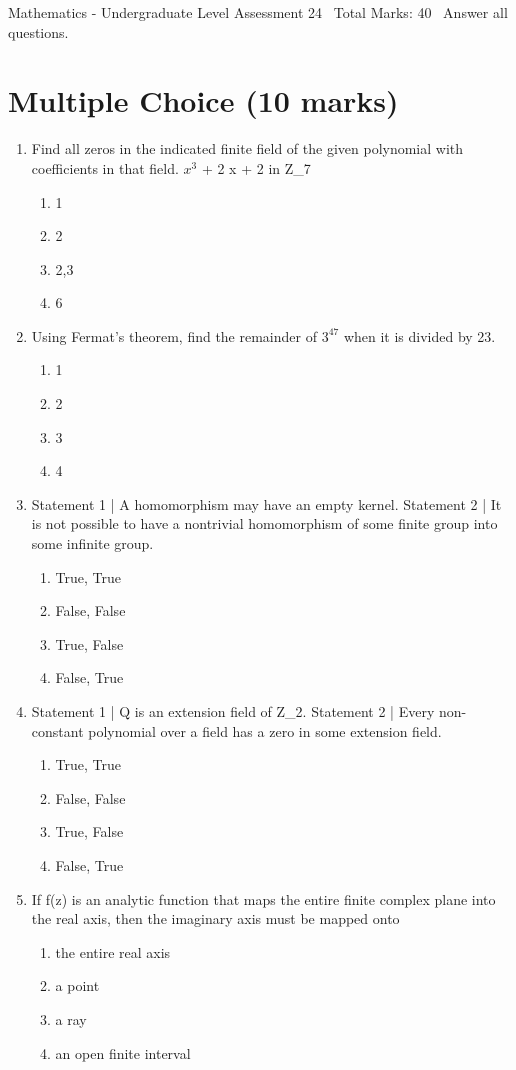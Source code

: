 \documentclass[12pt]{article}
\begin{document}
\begin{center}
Mathematics - Undergraduate Level Assessment 24 \
Total Marks: 40 \
Answer all questions.
\end{center}

\section*{Multiple Choice (10 marks)}
\begin{enumerate}[label=\arabic*.]
\item Find all zeros in the indicated finite field of the given polynomial with coefficients in that field. $x^3$ + 2 x + 2 in Z\_7
\begin{enumerate}[label=(\alph*)]
    \item 1
    \item 2
    \item 2,3
    \item 6
\end{enumerate}
\item Using Fermat's theorem, find the remainder of $3^47$ when it is divided by 23.
\begin{enumerate}[label=(\alph*)]
    \item 1
    \item 2
    \item 3
    \item 4
\end{enumerate}
\item Statement 1 | A homomorphism may have an empty kernel. Statement 2 | It is not possible to have a nontrivial homomorphism of some finite group into some infinite group.
\begin{enumerate}[label=(\alph*)]
    \item True, True
    \item False, False
    \item True, False
    \item False, True
\end{enumerate}
\item Statement 1 | Q is an extension field of Z\_2. Statement 2 | Every non-constant polynomial over a field has a zero in some extension field.
\begin{enumerate}[label=(\alph*)]
    \item True, True
    \item False, False
    \item True, False
    \item False, True
\end{enumerate}
\item If f(z) is an analytic function that maps the entire finite complex plane into the real axis, then the imaginary axis must be mapped onto
\begin{enumerate}[label=(\alph*)]
    \item the entire real axis
    \item a point
    \item a ray
    \item an open finite interval
\end{enumerate}
\end{enumerate}
\end{document}

